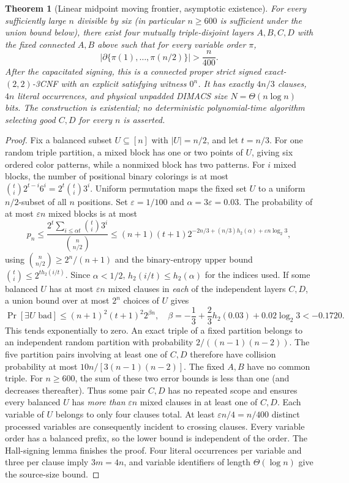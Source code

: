 \documentclass[11pt]{article}
\newtheorem{theorem}{Theorem}
\begin{document}
\begin{theorem}[Linear midpoint moving frontier, asymptotic existence]
For every sufficiently large $n$ divisible by six (in particular $n\ge600$ is sufficient under the union bound below), there exist \emph{four mutually triple-disjoint} layers $A,B,C,D$ with the fixed connected $A,B$ above such that for every variable order $\pi$,
\[
\left|\partial\{\pi(1),\ldots,\pi(n/2)\}\right|>\frac{n}{400}.
\]
After the capacitated signing, this is a connected proper strict signed exact-$(2,2)$-3CNF with an explicit satisfying witness $0^n$. It has exactly $4n/3$ clauses, $4n$ literal occurrences, and physical unpadded DIMACS size $N=\Theta(n\log n)$ bits. The construction is \emph{existential}; no deterministic polynomial-time algorithm selecting good $C,D$ for every $n$ is asserted.
\end{theorem}
\begin{proof}
Fix a balanced subset $U\subseteq[n]$ with $|U|=n/2$, and let $t=n/3$. For one random triple partition, a mixed block has one or two points of $U$, giving six ordered color patterns, while a nonmixed block has two patterns. For $i$ mixed blocks, the number of positional binary colorings is at most ${t\choose i}2^{t-i}6^i=2^t{t\choose i}3^i$. Uniform permutation maps the fixed set $U$ to a uniform $n/2$-subset of all $n$ positions. Set $\varepsilon=1/100$ and $\alpha=3\varepsilon=0.03$. The probability of at most $\varepsilon n$ mixed blocks is at most
\[
 p_n\le\frac{2^t\sum_{i\le\alpha t}{t\choose i}3^i}{{n\choose n/2}}
 \le(n+1)(t+1)2^{-2n/3+(n/3)h_2(\alpha)+\varepsilon n\log_2 3},
\]
using ${n\choose n/2}\ge2^n/(n+1)$ and the binary-entropy upper bound ${t\choose i}\le2^{t h_2(i/t)}$. Since $\alpha<1/2$, $h_2(i/t)\le h_2(\alpha)$ for the indices used. If some balanced $U$ has at most $\varepsilon n$ mixed clauses in \emph{each} of the independent layers $C,D$, a union bound over at most $2^n$ choices of $U$ gives
\[
 \Pr[\exists U\text{ bad}]
 \le(n+1)^2(t+1)^2 2^{\beta n},\quad
 \beta=-\frac13+\frac23h_2(0.03)+0.02\log_2 3
 <-0.1720.
\]
This tends exponentially to zero. An exact triple of a fixed partition belongs to an independent random partition with probability $2/((n-1)(n-2))$. The five partition pairs involving at least one of $C,D$ therefore have collision probability at most $10n/[3(n-1)(n-2)]$. The fixed $A,B$ have no common triple. For $n\ge600$, the sum of these two error bounds is less than one (and decreases thereafter). Thus some pair $C,D$ has no repeated scope and ensures every balanced $U$ has \emph{more than} $\varepsilon n$ mixed clauses in at least one of $C,D$. Each variable of $U$ belongs to only four clauses total. At least $\varepsilon n/4=n/400$ distinct processed variables are consequently incident to crossing clauses. Every variable order has a balanced prefix, so the lower bound is independent of the order. The Hall-signing lemma finishes the proof. Four literal occurrences per variable and three per clause imply $3m=4n$, and variable identifiers of length $\Theta(\log n)$ give the source-size bound.
\end{proof}
\end{document}
